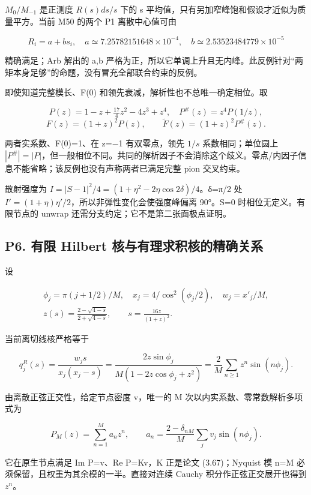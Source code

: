\documentclass[
  11pt,
  a4paper,
]{article}
\begin{document}
\(M_0/M_{-1}\) 是正测度 \(R(s)ds/s\) 下的 s
平均值，只有另加窄峰饱和假设才近似为质量平方。当前 M50 的两个 P1
离散中心值可由

\[
R_i=a+b s_i,\quad
a\simeq7.25782151648\times10^{-4},\quad
b\simeq2.53523484779\times10^{-5}
\]

精确满足；Arb 解出的 a,b
严格为正，所以它单调上升且无内峰。此反例针对``两矩本身足够''的命题，没有冒充全部联合约束的反例。

即使知道完整模长、F(0) 和领先衰减，解析性也不总唯一确定相位。取

\[
P(z)=1-z+\tfrac{17}4z^2-4z^3+z^4,\quad
P^\#(z)=z^4P(1/z),
\] \[
F(z)=(1+z)^2P(z),\qquad\widetilde F(z)=(1+z)^2P^\#(z).
\]

两者实系数、F(0)=1、在 z=−1 有双零点，领先 \(1/s\) 系数相同；单位圆上
\(|P^\#|=|P|\)，但一般相位不同。共同的解析因子不会消除这个歧义。零点/内因子信息不能省略；该反例也没有声称两者已满足完整
pion 交叉约束。

散射强度为 \(I=|S-1|^2/4=(1+\eta^2-2\eta\cos2\delta)/4\)。δ=π/2 处
\(I'=(1+\eta)\eta'/2\)，所以非弹性变化会使强度峰偏离 90°。S=0
时相位无定义。有限节点的 unwrap 还需分支约定；它不是第二张面极点证明。

\subsection{P6. 有限 Hilbert
核与有理求积核的精确关系}\label{p6.-ux6709ux9650-hilbert-ux6838ux4e0eux6709ux7406ux6c42ux79efux6838ux7684ux7cbeux786eux5173ux7cfb}

设

\[
\begin{gathered}
\phi_j=\pi(j+1/2)/M,\quad x_j=4/\cos^2(\phi_j/2),\quad w_j=x'_j/M,\\
z(s)=\frac{2-\sqrt{4-s}}{2+\sqrt{4-s}},\qquad s=\frac{16z}{(1+z)^2}.
\end{gathered}
\]

当前离切线核严格等于

\[
q^R_j(s)=\frac{w_js}{x_j(x_j-s)}
=\frac{2z\sin\phi_j}{M(1-2z\cos\phi_j+z^2)}
=\frac2M\sum_{n\ge1}z^n\sin(n\phi_j).
\]

由离散正弦正交性，给定节点密度 v，唯一的 M
次以内实系数、零常数解析多项式为

\[
P_M(z)=\sum_{n=1}^M a_nz^n,\qquad
a_n=\frac{2-\delta_{nM}}M\sum_jv_j\sin(n\phi_j).
\]

它在原生节点满足 Im P=v、Re P=Kv，K 正是论文 (3.67)；Nyquist 模 n=M
必须保留，且权重为其余模的一半。直接对连续 Cauchy
积分作正弦正交展开也得到 \(z^n\)。
\end{document}
